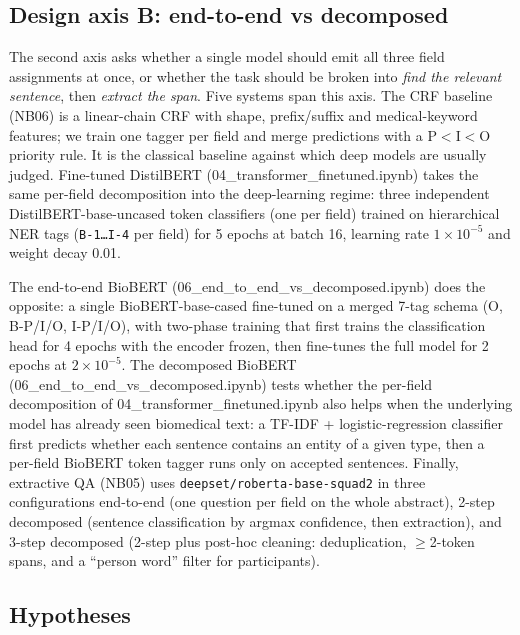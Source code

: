 \documentclass[11pt]{article}
\begin{document}
\subsection{Design axis B: end-to-end vs decomposed}

The second axis asks whether a single model should emit all three field
assignments at once, or whether the task should be broken into
\textit{find the relevant sentence}, then \textit{extract the span}.
Five systems span this axis. The CRF baseline (NB06) is a linear-chain
CRF \citep{lafferty2001crf} with shape, prefix/suffix and
medical-keyword features; we train one tagger per field and merge
predictions with a P$<$I$<$O priority rule. It is the classical
baseline against which deep models are usually judged. Fine-tuned
DistilBERT (04\_transformer\_finetuned.ipynb) takes the same per-field decomposition into the
deep-learning regime: three independent DistilBERT-base-uncased
\citep{sanh2019distilbert} token classifiers (one per field) trained on
hierarchical NER tags (\texttt{B-1\dots I-4} per field) for 5 epochs at
batch 16, learning rate $1\!\times\!10^{-5}$ and weight decay 0.01.

The end-to-end BioBERT (06\_end\_to\_end\_vs\_decomposed.ipynb) does the opposite: a single
BioBERT-base-cased \citep{lee2020biobert} fine-tuned on a merged 7-tag
schema (O, B-P/I/O, I-P/I/O), with two-phase training that first trains
the classification head for 4 epochs with the encoder frozen, then
fine-tunes the full model for 2 epochs at $2\!\times\!10^{-5}$. The
decomposed BioBERT (06\_end\_to\_end\_vs\_decomposed.ipynb) tests whether the per-field decomposition of 04\_transformer\_finetuned.ipynb also helps when the underlying model has already seen biomedical
text: a TF-IDF + logistic-regression classifier first predicts whether
each sentence contains an entity of a given type, then a per-field
BioBERT token tagger runs only on accepted sentences. Finally,
extractive QA (NB05) uses \texttt{deepset/roberta-base-squad2}
\citep{liu2019roberta} in three configurations end-to-end (one
question per field on the whole abstract), 2-step decomposed (sentence
classification by argmax confidence, then extraction), and 3-step
decomposed (2-step plus post-hoc cleaning: deduplication, $\geq$2-token
spans, and a ``person word'' filter for participants).

\subsection{Hypotheses}
\label{sec:hypotheses}
\end{document}
